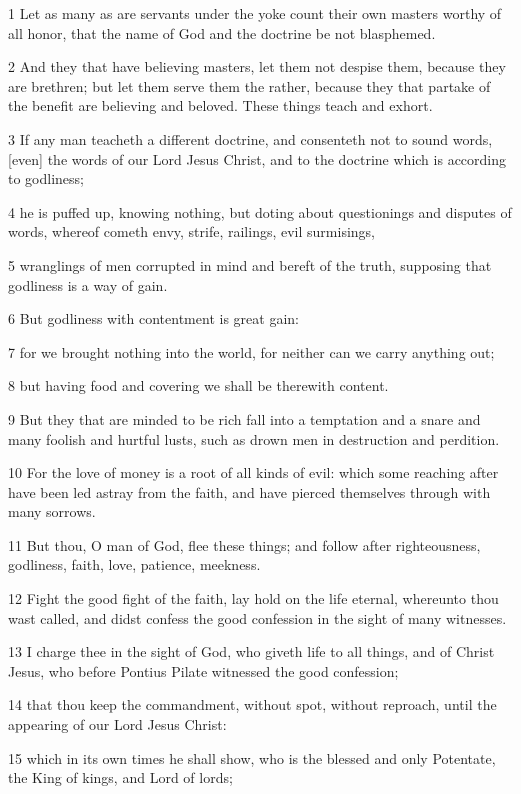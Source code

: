 \par 1 Let as many as are servants under the yoke count their own masters worthy of all honor, that the name of God and the doctrine be not blasphemed.
\par 2 And they that have believing masters, let them not despise them, because they are brethren; but let them serve them the rather, because they that partake of the benefit are believing and beloved. These things teach and exhort.
\par 3 If any man teacheth a different doctrine, and consenteth not to sound words, [even] the words of our Lord Jesus Christ, and to the doctrine which is according to godliness;
\par 4 he is puffed up, knowing nothing, but doting about questionings and disputes of words, whereof cometh envy, strife, railings, evil surmisings,
\par 5 wranglings of men corrupted in mind and bereft of the truth, supposing that godliness is a way of gain.
\par 6 But godliness with contentment is great gain:
\par 7 for we brought nothing into the world, for neither can we carry anything out;
\par 8 but having food and covering we shall be therewith content.
\par 9 But they that are minded to be rich fall into a temptation and a snare and many foolish and hurtful lusts, such as drown men in destruction and perdition.
\par 10 For the love of money is a root of all kinds of evil: which some reaching after have been led astray from the faith, and have pierced themselves through with many sorrows.
\par 11 But thou, O man of God, flee these things; and follow after righteousness, godliness, faith, love, patience, meekness.
\par 12 Fight the good fight of the faith, lay hold on the life eternal, whereunto thou wast called, and didst confess the good confession in the sight of many witnesses.
\par 13 I charge thee in the sight of God, who giveth life to all things, and of Christ Jesus, who before Pontius Pilate witnessed the good confession;
\par 14 that thou keep the commandment, without spot, without reproach, until the appearing of our Lord Jesus Christ:
\par 15 which in its own times he shall show, who is the blessed and only Potentate, the King of kings, and Lord of lords;

